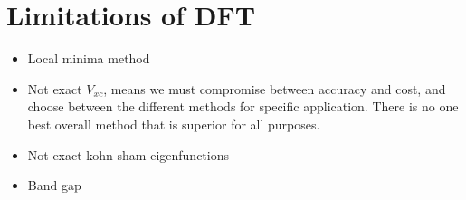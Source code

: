 \section{Limitations of DFT}
\begin{itemize}
    \item Local minima method
    \item Not exact $V_{xc}$, means we must compromise between accuracy and cost, and choose between the different methods for specific application. There is no one best overall method that is superior for all purposes. 
    \item Not exact kohn-sham eigenfunctions
    \item Band gap
\end{itemize}

